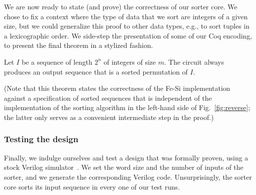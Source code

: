\documentclass{llncs}
\begin{document}
We are now ready to state (and prove) the correctness of our sorter
core. We chose to fix a context where the type of data that we
sort are integers of a given size, but we could generalize this proof
to other data types, e.g., to sort tuples in a lexicographic order.
We side-step the presentation of some of our Coq encoding, to present the final
theorem in a stylized fashion.
\begin{theorem}
Let $I$ be a sequence of length $2^n$ of integers of size $m$. The
circuit always produces an output sequence that is a sorted permutation of $I$.
\end{theorem}
(Note that this theorem states the correctness of the Fe-Si
implementation against a specification of sorted sequences that is
independent of the implementation of the sorting algorithm in the
left-hand side of Fig.~\ref{fig:reverse}; the latter only serves as a
convenient intermediate step in the proof.)



\subsubsection{Testing the design}
Finally, we indulge ourselves and test a design that was formally
proven, using a stock Verilog simulator~\cite{iverilog}. We set the
word size and the number of inputs of the sorter, and we generate the
corresponding Verilog code. Unsurprisingly, the sorter core sorts its
input sequence in every one of our test runs.
\end{document}

